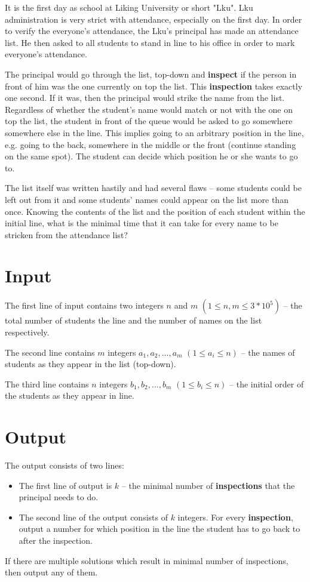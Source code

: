 
It is the first day as school at Liking University or short "Lku". Lku administration is very strict with attendance, especially on the first day. In order to verify the everyone's attendance, the Lku's principal has made an attendance list.
He then asked to all students to stand in line to his office in order to mark everyone's attendance.

The principal would go through the list, top-down and \textbf{inspect} if the person in front of him was the one currently on top the list. This \textbf{inspection} takes exactly one second. If it was, then the principal would strike the name from the list. Regardless of whether the student's name would match or not with the one on top the list, the student in front of the queue would be asked to go somewhere somewhere else in the line. This implies going to an arbitrary position in the line, e.g. going to the back, somewhere in the middle or the front (continue standing on the same spot). The student can decide which position he or she wants to go to.

The list itself was written hastily and had several flaws -- some students could be left out from it and some students' names could appear on the list more than once. Knowing the contents of the list and the position of each student within the initial line, what is the minimal time that it can take for every name to be stricken from the attendance list?

\section*{Input}

The first line of input contains two integers $n$ and $m$ $(1 \leq n,m \leq 3*10^5)$ -- the total number of students the line and the number of names on the list respectively.

The second line contains $m$ integers $a_1, a_2, ... , a_m$ $(1 \leq a_i \leq n)$ -- the names of students as they appear in the list (top-down).

The third line contains $n$ integers $b_1, b_2, ... , b_m$ $(1 \leq b_i \leq n)$ -- the initial order of the students as they appear in line.

\section*{Output}

The output consists of two lines:
\begin{itemize}
\item The first line of output is $k$ -- the minimal number of \textbf{inspections} that the principal needs to do.
\item The second line of the output consists of $k$ integers. For every \textbf{inspection}, output a number for which position in the line the student has to go back to after the inspection.

\end{itemize}

If there are multiple solutions which result in minimal number of inspections, then output any of them.

